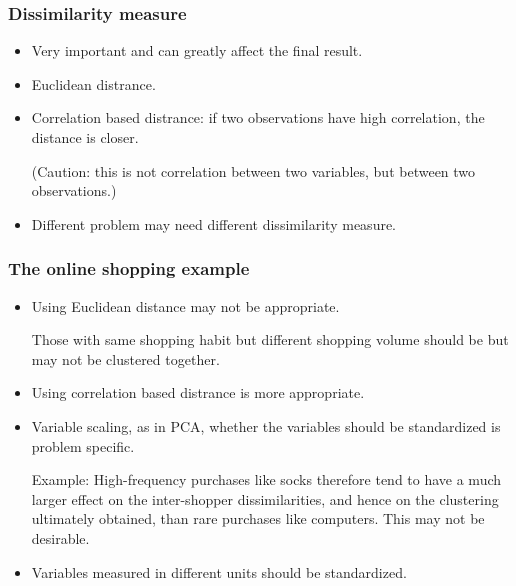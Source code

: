 \documentclass{beamer}
\begin{document}
                 
                    \begin{frame}
                    	\frametitle{ Dissimilarity measure }
                    	\begin{itemize}
                    		\item  Very important and can greatly affect the final result.
                    		
                    		\item  Euclidean distrance.
                    		
                    		\item  Correlation based distrance: if two observations have high correlation, the distance is closer. 
                    		
                    		(Caution: this is not correlation between two variables, but between two observations.)
                    		
                    		\item   Different problem may need different dissimilarity measure. 
                    		
                    	\end{itemize}
                    \end{frame}   
                   
            
            \begin{frame}
            	\frametitle{ The online shopping example}
            	\begin{itemize}
            		\item Using Euclidean distance may not be appropriate.
            		
            		Those with same shopping habit but different shopping volume should be but may not be 
            		clustered together.
            	 
            	\item  Using correlation based distrance is more appropriate. 
            	
            	\item   Variable scaling, as in PCA, whether the variables should be standardized is problem specific.
            	
            	 Example:  High-frequency purchases like socks therefore tend
            	to have a much larger effect on the inter-shopper dissimilarities, and hence
            	on the clustering ultimately obtained, than rare purchases like computers.
            	This may not be desirable.
            	
            	\item Variables measured in different units should be standardized.
             	
            	\end{itemize}
            \end{frame}   
            
\end{document}
